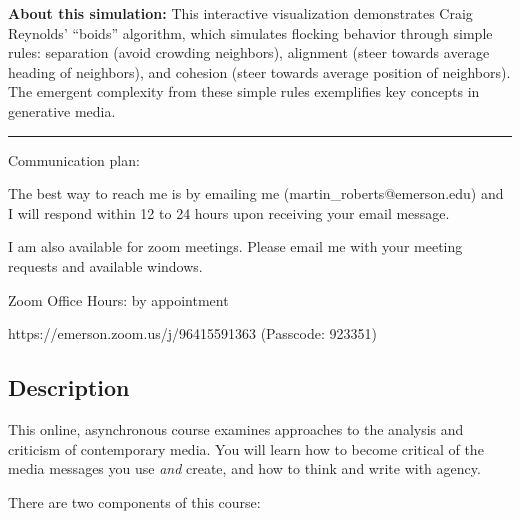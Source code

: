 \documentclass[
  letterpaper,
  DIV=11,
  numbers=noendperiod]{scrartcl}
\begin{document}
\begin{tcolorbox}[enhanced jigsaw, title=\textcolor{quarto-callout-note-color}{\faInfo}\hspace{0.5em}{Note}, colframe=quarto-callout-note-color-frame, coltitle=black, colback=white, leftrule=.75mm, opacityback=0, left=2mm, titlerule=0mm, toprule=.15mm, breakable, rightrule=.15mm, bottomtitle=1mm, toptitle=1mm, bottomrule=.15mm, colbacktitle=quarto-callout-note-color!10!white, arc=.35mm, opacitybacktitle=0.6]

\textbf{About this simulation:} This interactive visualization
demonstrates Craig Reynolds' ``boids'' algorithm, which simulates
flocking behavior through simple rules: separation (avoid crowding
neighbors), alignment (steer towards average heading of neighbors), and
cohesion (steer towards average position of neighbors). The emergent
complexity from these simple rules exemplifies key concepts in
generative media.

\end{tcolorbox}

\begin{center}\rule{0.5\linewidth}{0.5pt}\end{center}

Communication plan:

The best way to reach me is by emailing me (martin\_roberts@emerson.edu)
and I will respond within 12 to 24 hours upon receiving your email
message.

I am also available for zoom meetings. Please email me with your meeting
requests and available windows.

Zoom Office Hours: by appointment

https://emerson.zoom.us/j/96415591363 (Passcode: 923351)

\subsection{Description}\label{description}

This online, asynchronous course examines approaches to the analysis and
criticism of contemporary media. You will learn how to become critical
of the media messages you use \emph{and} create, and how to think and
write with agency.

There are two components of this course:
\end{document}
